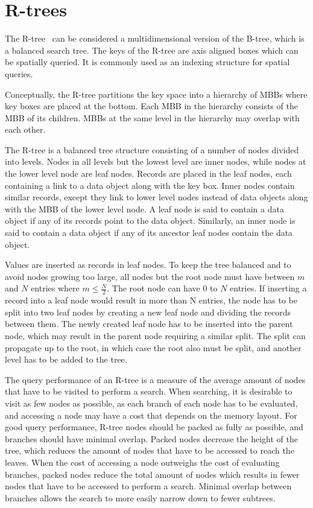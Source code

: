 \section{R-trees}

The R-tree~\cite{guttman1984r} can be considered a multidimensional version of the B-tree, which is a balanced search tree. The keys of the R-tree are axis aligned boxes which can be spatially queried. It is commonly used as an indexing structure for spatial queries.

Conceptually, the R-tree partitions the key space into a hierarchy of MBBs where key boxes are placed at the bottom. Each MBB in the hierarchy consists of the MBB of its children. MBBs at the same level in the hierarchy may overlap with each other.

The R-tree is a balanced tree structure consisting of a number of nodes divided into levels. Nodes in all levels but the lowest level are inner nodes, while nodes at the lower level node are leaf nodes. Records are placed in the leaf nodes, each containing a link to a data object along with the key box. Inner nodes contain similar records, except they link to lower level nodes instead of data objects along with the MBB of the lower level node. A leaf node is said to contain a data object if any of its records point to the data object. Similarly, an inner node is said to contain a data object if any of its ancestor leaf nodes contain the data object.

Values are inserted as records in leaf nodes. To keep the tree balanced and to avoid nodes growing too large, all nodes but the root node must have between \(m\) and \(N\) entries where \(m \leq \frac{N}{2}\). The root node can have \(0\) to \(N\) entries. If inserting a record into a leaf node would result in more than N entries, the node has to be split into two leaf nodes by creating a new leaf node and dividing the records between them. The newly created leaf node has to be inserted into the parent node, which may result in the parent node requiring a similar split. The split can propagate up to the root, in which case the root also must be split, and another level has to be added to the tree.

The query performance of an R-tree is a measure of the average amount of nodes that have to be visited to perform a search. When searching, it is desirable to visit as few nodes as possible, as each branch of each node has to be evaluated, and accessing a node may have a cost that depends on the memory layout. For good query performance, R-tree nodes should be packed as fully as possible, and branches should have minimal overlap. Packed nodes decrease the height of the tree, which reduces the amount of nodes that have to be accessed to reach the leaves. When the cost of accessing a node outweighs the cost of evaluating branches, packed nodes reduce the total amount of nodes which results in fewer nodes that have to be accessed to perform a search. Minimal overlap between branches allows the search to more easily narrow down to fewer subtrees.

